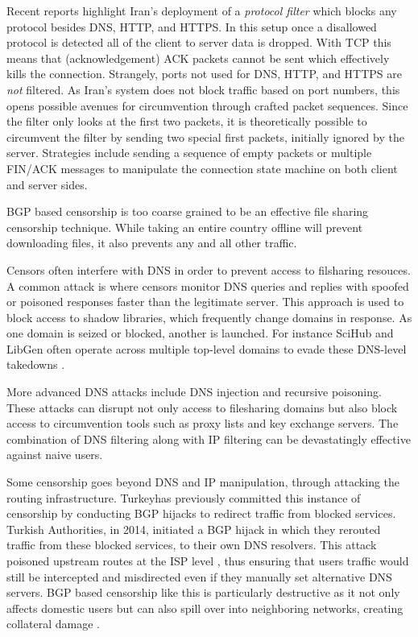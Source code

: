 Recent reports highlight Iran's deployment of a \emph{protocol filter} which blocks any
protocol besides DNS, HTTP, and HTTPS.
\cite{bockDetectingEvadingCensorshipDepth} In this setup once a disallowed
protocol is detected all of the client to server data is dropped. With TCP this
means that (acknowledgement) ACK packets cannot be sent which effectively kills the connection.
\cite[\S 4.1]{bockDetectingEvadingCensorshipDepth} Strangely, ports not used for
DNS, HTTP, and HTTPS are \emph{not} filtered. As Iran’s system does not block traffic based on port 
numbers, this opens possible avenues for circumvention through crafted packet sequences.
Since the filter only looks at the first two packets, it is theoretically possible to 
circumvent the filter by sending two special first packets, initially ignored by the 
server. Strategies include sending a sequence of empty packets or multiple FIN/ACK messages 
to manipulate the connection state machine on both client and server sides.

BGP based censorship is too coarse grained to be an effective file sharing
censorship technique. While taking an entire country offline will prevent
downloading files, it also prevents any and all other traffic.\cite[p.\@
      5]{wendzelSurveyInternetCensorship2025}

Censors often interfere with DNS in order to prevent access to filsharing resouces. A
common attack is where censors monitor DNS queries and replies with spoofed or poisoned 
responses faster than the legitimate server. This approach is used to block access to shadow libraries, 
which frequently change domains in response. As one domain is seized or blocked, another is launched. 
For instance SciHub and LibGen often operate across multiple top-level domains to evade these 
DNS-level takedowns \cite{bortzmeyer2017scihub}. 

More advanced DNS attacks include DNS injection and recursive poisoning. These attacks can disrupt 
not only access to filesharing domains but also block access to circumvention tools such as proxy 
lists and key exchange servers. The combination of DNS filtering along with IP filtering can be 
devastatingly effective against naive users.

Some censorship goes beyond DNS and IP manipulation, through attacking the routing infrastructure. 
Turkeyhas previously committed this instance of censorship by conducting BGP hijacks to redirect 
traffic from blocked services. Turkish Authorities, in 2014, initiated a BGP hijack in which 
they rerouted traffic from these blocked services, to their own DNS resolvers. This attack poisoned 
upstream routes at the ISP level \cite{internetsociety2014_hijack}, thus ensuring that users 
traffic would still be intercepted and misdirected even if they manually set alternative DNS 
servers. BGP based censorship like this is particularly destructive as it not only affects domestic 
users but can also spill over into neighboring networks, creating collateral damage \cite{chung2017dnssec}. 

